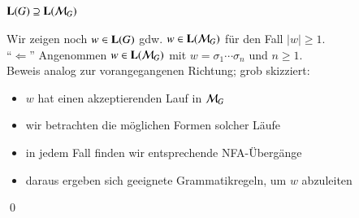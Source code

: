 \documentclass[onlymath]{beamer}
\begin{document}
\begin{frame}[t]\frametitle{$\textbf{\textcolor{black}{L}}(G)\supseteq\textbf{\textcolor{black}{L}}(\mathcal{M}_G)$}

Wir zeigen noch $w\in\textbf{\textcolor{black}{L}}(G)$ gdw. $w\in\textbf{\textcolor{black}{L}}(\mathcal{M}_G)$ für den Fall $|w|\geq 1$.\\[1ex]

"`$\Leftarrow$"' Angenommen $w\in\textbf{\textcolor{black}{L}}(\mathcal{M}_G)$ mit $w=\sigma_1\cdots\sigma_n$ und $n\geq 1$.\pause\\[2ex]

Beweis analog zur vorangegangenen Richtung; grob skizziert:
\begin{itemize}
\item $w$ hat einen akzeptierenden Lauf in $\mathcal{M}_G$
\item wir betrachten die möglichen Formen solcher Läufe
\item in jedem Fall finden wir entsprechende NFA-Übergänge
\item daraus ergeben sich geeignete Grammatikregeln, um $w$ abzuleiten
\end{itemize}

\qed

\end{frame}
\end{document}
